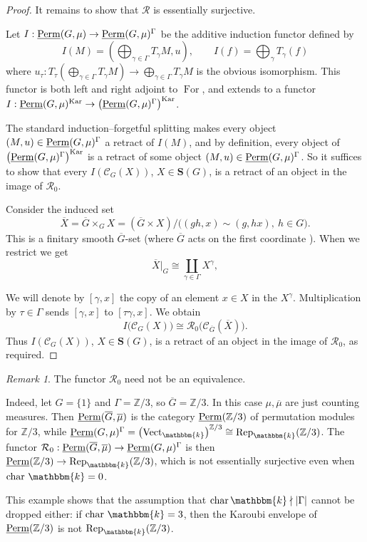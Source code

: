 \documentclass[11pt,a4paper]{amsart}
\theoremstyle{plain}%
\theoremstyle{definition}
\theoremstyle{remark}
\newtheorem{remark}[lemma]{Remark}
\newcommand{\Z}{{\mathbb Z}}
\newcommand{\Perm}{\underline{{\rm Perm}}}
\newcommand{\Rep}{\operatorname{Rep}}
\newcommand{\kk}{\mathbbm{k}}
\newcommand{\Vect}{\mathrm{Vect}_{\kk}}
\newcommand{\Kar}{\mathrm{Kar}}
\newcommand{\cC}{\mathcal{C}}
\newcommand{\Set}[1]{\mathbf{S}(#1)}
\newcommand{\oG}{{\overline{G}}}
\newcommand{\For}{\operatorname{For}}
\begin{document}
\begin{proof}
It remains to show that $\mathcal{R}$ is essentially surjective.

Let $I:\Perm(G, \mu)\to\Perm(G, \mu)^{\Gamma}$ be the additive induction functor defined by
\[
 I(M)=(\bigoplus_{\gamma\in \Gamma}T_\gamma M, u), \qquad I(f)=\bigoplus_\gamma T_\gamma(f)\]
 where $u_{\tau}: T_{\tau}\left(\bigoplus_{\gamma\in \Gamma}T_\gamma M\right)\to \bigoplus_{\gamma\in \Gamma}T_\gamma M$ is the obvious isomorphism. 
This functor is both left and right adjoint to $\For$, and extends to a functor $I:\Perm(G, \mu)^{\Kar}\to\left(\Perm(G, \mu)^{\Gamma}\right)^{\Kar}$.

The standard induction--forgetful splitting \cite[Lemma~2.14(1),(3)]{Sun-equivariantization} makes every object $(M,u)\in \Perm(G, \mu)^{\Gamma}$ a retract of $I(M)$, and by definition, every object of $\left(\Perm(G, \mu)^{\Gamma}\right)^{\Kar}$ is a {retract} of some object $(M,u)\in \Perm(G, \mu)^{\Gamma}$. So it suffices to show that every $I(\cC_G(X))$, $X\in \Set{G}$, is a retract of an object in the image of $\mathcal{R}_0$.

Consider the induced set
\[
 \overline{X}=\oG\times_{G}X
   =(\oG\times X)/\bigl((gh,x)\sim(g,hx),\ h\in G\bigr).
\]
This is a finitary smooth $\oG$-set (where $\oG$ acts on the first coordinate \cite[\S2.4]{HS-oligomorphic}). When we restrict we get
\[
 \overline{X}|_{G}\cong\coprod_{\gamma\in \Gamma} X^\gamma,
\]

We will denote by $[\gamma,x]$ the copy of an element $x\in X$ in the $X^\gamma$. Multiplication by $\tau\in \Gamma$ sends $[\gamma,x]$ to $[\tau\gamma,x]$. We obtain
\[
 I\bigl(\mathcal C_{G}(X)\bigr)\cong\mathcal R_0\bigl(\mathcal C_{\oG}(\overline{X})\bigr).
\]
Thus $I(\cC_G(X))$, $X\in \Set{G}$, is a retract of an object in the image of $\mathcal R_0$, as required.
\end{proof}
\begin{remark}
The functor $\mathcal{R}_0$ need not be an equivalence. 

Indeed, let $G=\{1\}$ and $\Gamma=\Z/3$, so $\oG=\Z/3$. In this case $\mu, \overline{\mu}$ are just counting measures. Then $\Perm(\oG, \overline{\mu})$ is the category $\Perm(\Z/3)$ of permutation modules for $\Z/3$, while $\Perm(G, {\mu})^{\Gamma}=\left(\Vect\right)^{\Z/3}\cong \Rep_{\kk}(\Z/3)$. The functor $\mathcal{R}_0:\Perm(\oG, \overline{\mu})\to \Perm(G, {\mu})^{\Gamma}$ is then $\Perm(\Z/3)\to \Rep_{\kk}(\Z/3)$, which is not essentially surjective even when $\mathrm{char}~\kk=0$. 

    This example shows that the assumption that $\operatorname{char}\kk\nmid |\Gamma| $ cannot be dropped either: if $\mathrm{char}~\kk=3$, then the Karoubi envelope of $\Perm(\Z/3)$ is not $\Rep_{\kk}(\Z/3)$.
\end{remark}
\end{document}
